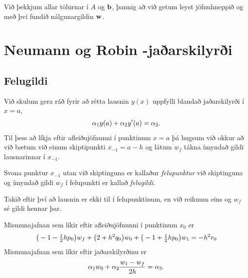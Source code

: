 \documentclass[letterpaper,10pt,icelandic]{sphinxmanual}
\begin{document}
Við þekkjum allar tölurnar í \(A\) og \(\bf b\), þannig að
við getum leyst jöfnuhneppið og með því fundið
nálgunargildin \(\bf w\).


\section{Neumann og Robin -jaðarskilyrði}
\label{kafli07:neumann-og-robin-jaarskilyri}\label{kafli07:index-4}

\subsection{Felugildi}
\label{kafli07:felugildi}
Við skulum gera ráð fyrir að rétta lausnin \(y(x)\) uppfylli blandað
jaðarskilyrði í \(x=a\),
\begin{gather}
\begin{split}\alpha_1y(a)+\alpha_2 y'(a)=\alpha_3.\end{split}\notag
\end{gather}
Til þess að líkja eftir afleiðujöfnunni í punktinum \(x=a\) þá
hugsum við okkur að við bætum við einum skiptipunkti \(x_{-1}=a-h\) og
látum \(w_f\) tákna ímyndað gildi lausnarinnar í \(x_{-1}\).

Svona punktur \(x_{-1}\) utan við skiptinguna er kallaður
\emph{felupunktur} við skiptinguna og ímyndað gildi \(w_f\) í felupunkti
er kallað \emph{felugildi}.

Takið eftir því að lausnin er ekki til í felupunktinum, en við reiknum
eins og \(w_f\) sé gildi hennar þar.

Mismunajafnan sem líkir eftir afleiðujöfnunni í punktinum \(x_0\) er
\begin{gather}
\begin{split}\big(-1-\tfrac 12 hp_0\big)w_f+\big(2+h^2 q_0\big)w_0
+\big(-1+\tfrac 12 hp_0\big)w_1=-h^2r_0\end{split}\notag
\end{gather}
Mismunajafnan sem líkir eftir jaðarskilyrðinu er
\begin{gather}
\begin{split}\alpha_1w_0+\alpha_2 \dfrac{w_1-w_f}{2h}=\alpha_3.\end{split}\notag
\end{gather}
\end{document}
